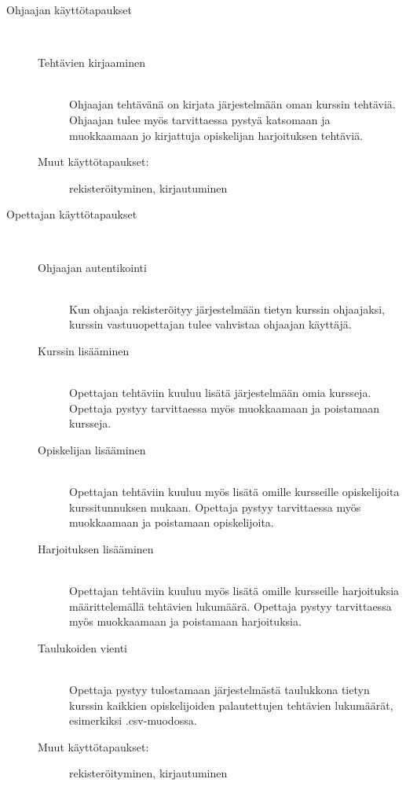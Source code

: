 \documentclass[a4paper,12pt, titlepage]{article}
\begin{document}
\begin{description}
	\item[Ohjaajan käyttötapaukset] \hfill \\
	\begin{description}
		\item[Tehtävien kirjaaminen] \hfill \\
		Ohjaajan tehtävänä on kirjata järjestelmään oman kurssin tehtäviä.
		Ohjaajan tulee myös tarvittaessa pystyä katsomaan ja muokkaamaan
		jo kirjattuja opiskelijan harjoituksen tehtäviä.
		\item[Muut käyttötapaukset:] rekisteröityminen, kirjautuminen
	\end{description}
	\item[Opettajan käyttötapaukset] \hfill \\
	\begin{description}
		\item[Ohjaajan autentikointi] \hfill \\
		Kun ohjaaja rekisteröityy järjestelmään tietyn kurssin ohjaajaksi,
		kurssin vastuuopettajan tulee vahvistaa ohjaajan käyttäjä.
		\item[Kurssin lisääminen] \hfill \\
		Opettajan tehtäviin kuuluu lisätä järjestelmään omia kursseja.
		Opettaja pystyy tarvittaessa myös muokkaamaan ja poistamaan kursseja.
		\item[Opiskelijan lisääminen] \hfill \\
		Opettajan tehtäviin kuuluu myös lisätä omille kursseille opiskelijoita
		kurssitunnuksen mukaan. Opettaja pystyy tarvittaessa myös muokkaamaan
		ja poistamaan opiskelijoita.
		\item[Harjoituksen lisääminen] \hfill \\
		Opettajan tehtäviin kuuluu myös lisätä omille kursseille harjoituksia
		määrittelemällä tehtävien lukumäärä. Opettaja pystyy tarvittaessa
		myös muokkaamaan ja poistamaan harjoituksia.
		\item[Taulukoiden vienti] \hfill \\
		Opettaja pystyy tulostamaan järjestelmästä taulukkona tietyn kurssin
		kaikkien opiskelijoiden palautettujen tehtävien lukumäärät, esimerkiksi
		.csv-muodossa.
		\item[Muut käyttötapaukset:] rekisteröityminen, kirjautuminen
	\end{description}
\end{description}
\end{document}
